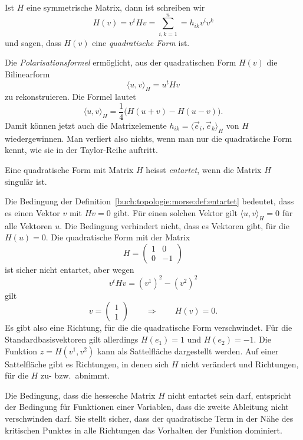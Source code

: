 \begin{definition}
Ist $H$ eine symmetrische Matrix, dann ist schreiben wir
\[
H(v)
=
v^tHv
=
\sum_{i,k=1}^n = h_{ik} v^iv^k
\]
und sagen, dass $H(v)$ eine \emph{quadratische Form} ist.
%
\end{definition}

Die \emph{Polarisationsformel} \cite[p.~347]{buch:linalg} ermöglicht,
aus der quadratischen Form
$H(v)$ die Bilinearform
\[
\langle u,v\rangle_H
=
u^tHv
\]
zu rekonstruieren.
Die Formel lautet
\[
\langle u,v\rangle_H
=
\frac14\bigl(H(u+v) - H(u-v)\bigr).
\]
Damit können jetzt auch die Matrixelemente
$h_{ik} = \langle\vec{e}_i,\vec{e}_k\rangle_H$ von $H$
wiedergewinnen.
Man verliert also nichts, wenn man nur die quadratische Form kennt,
wie sie in der Taylor-Reihe auftritt.

\begin{definition}
\label{buch:topologie:morse:def:entartet}
Eine quadratische Form mit Matrix $H$ heisst \emph{entartet}, wenn
die Matrix $H$ singulär ist.
%
\end{definition}

Die Bedingung der Definition~\ref{buch:topologie:morse:def:entartet}
bedeutet, dass es einen Vektor $v$ mit $Hv=0$ gibt.
Für einen solchen Vektor gilt $\langle u,v\rangle_H=0$
für alle Vektoren $u$.
Die Bedingung verhindert nicht, dass es Vektoren gibt, für die
$H(u)=0$.
Die quadratische Form mit der Matrix
\[
H=
\begin{pmatrix}
1&0\\0&-1
\end{pmatrix}
\]
ist sicher nicht entartet, aber wegen
\[
v^tHv
=
(v^1)^2-(v^2)^2
\]
gilt
\[
v=\begin{pmatrix}1\\1\end{pmatrix}
\qquad\Rightarrow\qquad
H(v) = 0.
\]
Es gibt also eine Richtung, für die die quadratische Form verschwindet.
Für die Standardbasisvektoren gilt allerdings
$ H(e_1)=1$ und $H(e_2)=-1$.
Die Funktion $z=H(v^1,v^2)$ kann als Sattelfläche dargestellt werden.
Auf einer Sattelfläche gibt es Richtungen, in denen sich $H$ nicht
verändert und Richtungen, für die $H$ zu- bzw.~abnimmt.

Die Bedingung, dass die hessesche Matrix $H$ nicht entartet sein darf,
entspricht der Bedingung für Funktionen einer Variablen, dass die zweite
Ableitung nicht verschwinden darf.
Sie stellt sicher, dass der quadratische Term in der Nähe des kritischen
Punktes in alle Richtungen das Vorhalten der Funktion dominiert.

